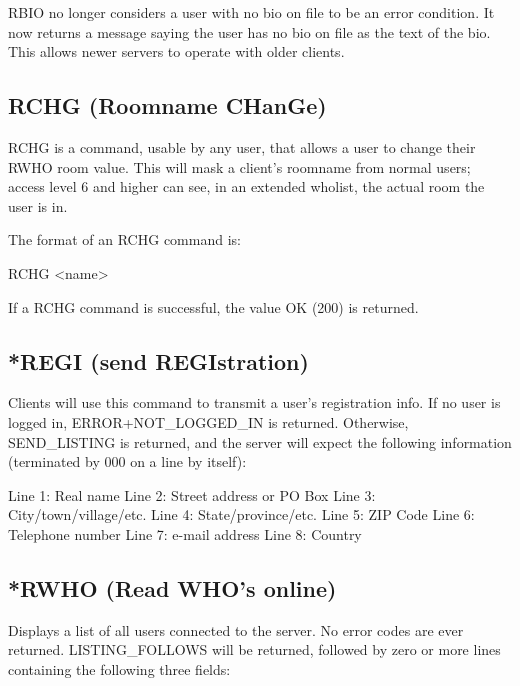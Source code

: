  RBIO no longer considers a user with no bio on file to be an error condition.
It now returns a message saying the user has no bio on file as the text of the
bio.  This allows newer servers to operate with older clients.



\subsection{RCHG (Roomname CHanGe)}

 RCHG is a command, usable by any user, that allows a user to change their RWHO
room value.  This will mask a client's roomname from normal users; access
level 6 and higher can see, in an extended wholist, the actual room the user
is in.

 The format of an RCHG command is:

 RCHG <name>

 If a RCHG command is successful, the value OK (200) is returned.



\subsection{*REGI (send REGIstration)}

 Clients will use this command to transmit a user's registration info.  If
no user is logged in, ERROR+NOT_LOGGED_IN is returned.  Otherwise,
SEND_LISTING is returned, and the server will expect the following information
(terminated by 000 on a line by itself):

 Line 1:  Real name
 Line 2:  Street address or PO Box
 Line 3:  City/town/village/etc.
 Line 4:  State/province/etc.
 Line 5:  ZIP Code
 Line 6:  Telephone number
 Line 7:  e-mail address
 Line 8:  Country



\subsection{*RWHO (Read WHO's online)}

 Displays a list of all users connected to the server.  No error codes are
ever returned.  LISTING_FOLLOWS will be returned, followed by zero or more
lines containing the following three fields:

